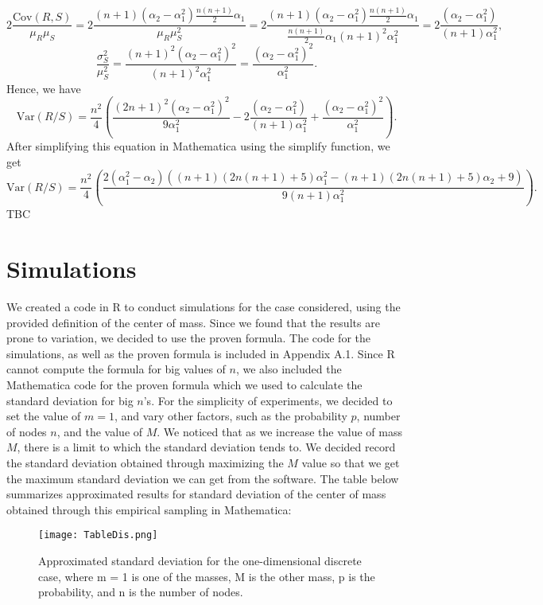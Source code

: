 \documentclass[11pt, twoside, reqno]{book}
\newcommand{\Var}{\text{Var}}
\newcommand{\Cov}{\text{Cov}}
\begin{document}
$$2 \frac{\Cov(R, S)}{\mu_{R}\mu_{S}} = 2 \frac{(n+1)(\alpha_{2}-\alpha^{2}_{1})\frac{n(n+1)}{2}\alpha_{1}}{\mu_{R}\mu_{S}^{2}} =2 \frac{(n+1)(\alpha_{2}-\alpha^{2}_{1})\frac{n(n+1)}{2}\alpha_{1}}{\frac{n(n+1)}{2}\alpha_{1} (n+1)^{2}\alpha_{1}^{2}} = 2\frac{(\alpha_{2}-\alpha^{2}_{1})}{(n+1)\alpha_{1}^{2}},$$
$$\frac{\sigma_{S}^{2}}{\mu_{S}^{2}} = \frac{(n+1)^{2}(\alpha_{2}-\alpha^{2}_{1})^{2}}{(n+1)^{2}\alpha^{2}_{1}}=\frac{(\alpha_{2}-\alpha^{2}_{1})^{2}}{\alpha^{2}_{1}}.$$
Hence, we have 
$$\Var(R/S) =  \frac{ n^{2}}{4}\left(\frac{(2n+1)^{2}(\alpha_{2}-\alpha^{2}_{1})^{2}}{9\alpha^{2}_{1}} -  2\frac{(\alpha_{2}-\alpha^{2}_{1})}{(n+1)\alpha_{1}^{2}} + \frac{(\alpha_{2}-\alpha^{2}_{1})^{2}}{\alpha^{2}_{1}} \right).$$
After simplifying this equation in Mathematica using the simplify function, we get 
$$\Var(R/S) =\frac{n^2}{4}\left(\frac{2 \left(\alpha_{1}^{2}-\alpha_{2}\right) \left((n+1) (2 n (n+1)+5) \alpha_{1}^{2}-(n+1) (2 n (n+1)+5) \alpha_{2}+9\right)}{9 (n+1) \alpha_{1}^{2}}\right).$$
TBC

\section{Simulations}
\label{secA4}
We created a code in R to conduct simulations for the case considered, using the provided definition of the center of mass. Since we found that the results are prone to variation, we decided to use the proven formula. The code for the simulations, as well as the proven formula is included in Appendix A.1. Since R cannot compute the formula for big values of $n$, we also included the Mathematica code for the proven formula which we used to calculate the standard deviation for big $n$'s. For the simplicity of experiments, we decided to set the value of $m=1$, and vary other factors, such as the probability $p$, number of nodes $n$, and the value of $M$. We noticed that as we increase the value of mass $M$, there is a limit to which the standard deviation tends to. We decided record the standard deviation obtained through maximizing the $M$ value so that we get the maximum standard deviation we can get from the software. The table below summarizes approximated results for standard deviation of the center of mass obtained through this empirical sampling in Mathematica:

\begin{figure}[ht]
\centering
\texttt{[image: TableDis.png]}
\caption{Approximated standard deviation for the one-dimensional discrete case, where m = 1 is one of the masses, M is the other mass, p is the probability, and n is the number of nodes.}
\label{TableDis}
\end{figure}
 
\end{document}
